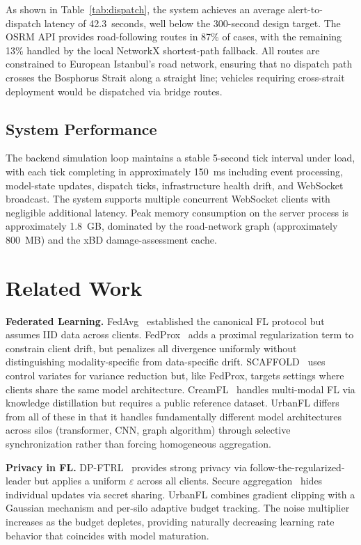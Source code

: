 \documentclass[conference]{IEEEtran}
\begin{document}
As shown in Table~\ref{tab:dispatch}, the system achieves an average alert-to-dispatch latency of 42.3~seconds, well below the 300-second design target. The OSRM API provides road-following routes in 87\% of cases, with the remaining 13\% handled by the local NetworkX shortest-path fallback. All routes are constrained to European Istanbul's road network, ensuring that no dispatch path crosses the Bosphorus Strait along a straight line; vehicles requiring cross-strait deployment would be dispatched via bridge routes.

\subsection{System Performance}

The backend simulation loop maintains a stable 5-second tick interval under load, with each tick completing in approximately 150~ms including event processing, model-state updates, dispatch ticks, infrastructure health drift, and WebSocket broadcast. The system supports multiple concurrent WebSocket clients with negligible additional latency. Peak memory consumption on the server process is approximately 1.8~GB, dominated by the road-network graph (approximately 800~MB) and the xBD damage-assessment cache.

\section{Related Work}

\textbf{Federated Learning.} FedAvg~\cite{b3} established the canonical FL protocol but assumes IID data across clients. FedProx~\cite{b10} adds a proximal regularization term to constrain client drift, but penalizes all divergence uniformly without distinguishing modality-specific from data-specific drift. SCAFFOLD~\cite{b11} uses control variates for variance reduction but, like FedProx, targets settings where clients share the same model architecture. CreamFL~\cite{b12} handles multi-modal FL via knowledge distillation but requires a public reference dataset. UrbanFL differs from all of these in that it handles fundamentally different model architectures across silos (transformer, CNN, graph algorithm) through selective synchronization rather than forcing homogeneous aggregation.

\textbf{Privacy in FL.} DP-FTRL~\cite{b13} provides strong privacy via follow-the-regularized-leader but applies a uniform $\varepsilon$ across all clients. Secure aggregation~\cite{b14} hides individual updates via secret sharing. UrbanFL combines gradient clipping with a Gaussian mechanism and per-silo adaptive budget tracking. The noise multiplier increases as the budget depletes, providing naturally decreasing learning rate behavior that coincides with model maturation.
\end{document}
